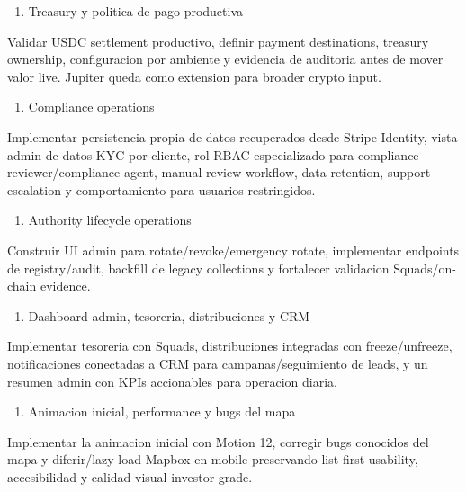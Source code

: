 \documentclass[
  10pt,
  letterpaper,
]{article}
\providecommand{\tightlist}{%
  \setlength{\itemsep}{0pt}\setlength{\parskip}{0pt}}
\begin{document}
\begin{enumerate}
\def\labelenumi{\arabic{enumi}.}
\setcounter{enumi}{2}
\tightlist
\item
  Treasury y politica de pago productiva
\end{enumerate}

Validar USDC settlement productivo, definir payment destinations,
treasury ownership, configuracion por ambiente y evidencia de auditoria
antes de mover valor live. Jupiter queda como extension para broader
crypto input.

\begin{enumerate}
\def\labelenumi{\arabic{enumi}.}
\setcounter{enumi}{3}
\tightlist
\item
  Compliance operations
\end{enumerate}

Implementar persistencia propia de datos recuperados desde Stripe
Identity, vista admin de datos KYC por cliente, rol RBAC especializado
para compliance reviewer/compliance agent, manual review workflow, data
retention, support escalation y comportamiento para usuarios
restringidos.

\begin{enumerate}
\def\labelenumi{\arabic{enumi}.}
\setcounter{enumi}{4}
\tightlist
\item
  Authority lifecycle operations
\end{enumerate}

Construir UI admin para rotate/revoke/emergency rotate, implementar
endpoints de registry/audit, backfill de legacy collections y fortalecer
validacion Squads/on-chain evidence.

\begin{enumerate}
\def\labelenumi{\arabic{enumi}.}
\setcounter{enumi}{5}
\tightlist
\item
  Dashboard admin, tesoreria, distribuciones y CRM
\end{enumerate}

Implementar tesoreria con Squads, distribuciones integradas con
freeze/unfreeze, notificaciones conectadas a CRM para
campanas/seguimiento de leads, y un resumen admin con KPIs accionables
para operacion diaria.

\begin{enumerate}
\def\labelenumi{\arabic{enumi}.}
\setcounter{enumi}{6}
\tightlist
\item
  Animacion inicial, performance y bugs del mapa
\end{enumerate}

Implementar la animacion inicial con Motion 12, corregir bugs conocidos
del mapa y diferir/lazy-load Mapbox en mobile preservando list-first
usability, accesibilidad y calidad visual investor-grade.
\end{document}
